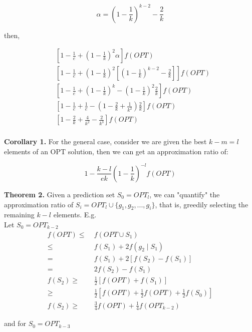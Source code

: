 \documentclass{article}
\begin{document}
\[\alpha = \left(1-\frac{1}{k}\right)^{k-2} - \frac{2}{k}\]


then, 

$$\begin{aligned}
    &\left[1 - \frac{1}{e} + \left(1 - \frac{1}{k}\right)^{2}\alpha\right]f(OPT) \\
    &\left[1 - \frac{1}{e} + \left(1 - \frac{1}{k}\right)^{2}\left[\left(1-\frac{1}{k}\right)^{k-2} - \frac{2}{k}\right]\right]f(OPT) \\
    &\left[1 - \frac{1}{e} + \left(1 - \frac{1}{k}\right)^{k} -\left(1-\frac{1}{k}\right)^{2} \frac{2}{k}\right]f(OPT) \\
    &\left[1 - \frac{1}{e} + \frac{1}{e} -\left(1-\frac{2}{k}+\frac{1}{k^2}\right) \frac{2}{k}\right]f(OPT) \\
    &\left[1 - \frac{2}{k} + \frac{4}{k^2} - \frac{2}{k^3}\right] f(OPT) \\
\end{aligned}$$


\textbf{Corollary 1.} For the general case, consider we are given the best $k-m = l$ elements of an OPT solution, then we can get an approximation ratio of:

$$
1 - \frac{k-l}{ek}\left(1 - \frac{1}{k}\right)^{-l} f(OPT)
$$

\noindent\textbf{Theorem 2.} Given a prediction set $S_0 = OPT_{l}$, we can "quantify" the approximation ratio of $S_i = OPT_{l} \cup \{g_1, g_2, ..., g_i\}$, that is, greedily selecting the remaining $k-l$ elements. E.g.\\

Let $S_0 = OPT_{k-2}$
$$\begin{aligned}
    f(OPT) \leq \;& f(OPT \cup S_1)\\
           \leq \;     & f(S_1) + 2f(g_2\;|\;S_1) \\
           =\;     & f(S_1) + 2[f(S_2) - f(S_1)] \\
           =\;     & 2f(S_2) - f(S_1) \\
    f(S_2) \geq\; & \frac{1}{2}\left[ f(OPT) + f(S_1) \right] \\
           \geq\;     & \frac{1}{2}\left[ f(OPT) + \frac{1}{2} f(OPT) + \frac{1}{2}f(S_0) \right]\\
    f(S_2) \geq\; & \frac{3}{4}f(OPT) + \frac{1}{4}f(OPT_{k-2})
\end{aligned}
$$

and for $S_0 = OPT_{k-3}$
\end{document}
